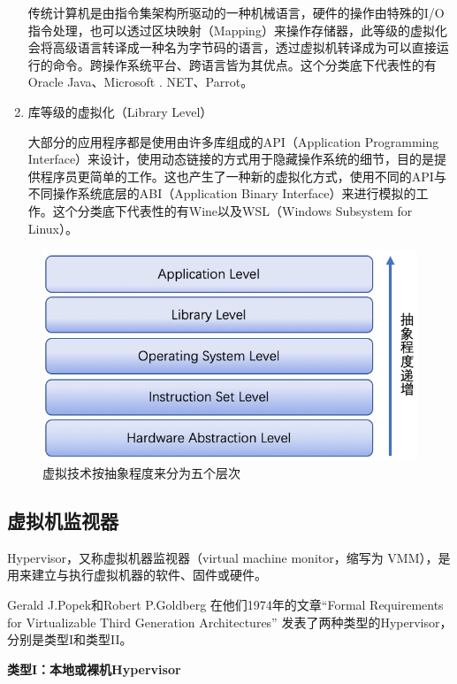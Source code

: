\begin{enumerate}
      \hspace{2em} 传统计算机是由指令集架构所驱动的一种机械语言，硬件的操作由特殊的I/O指令处理，也可以透过区块映射（Mapping）来操作存储器，此等级的虚拟化会将高级语言转译成一种名为字节码的语言，透过虚拟机转译成为可以直接运行的命令。跨操作系统平台、跨语言皆为其优点。这个分类底下代表性的有Oracle Java、Microsoft . NET、Parrot。
    \item 库等级的虚拟化（Library Level）

      \hspace{2em} 大部分的应用程序都是使用由许多库组成的API（Application Programming Interface）来设计，使用动态链接的方式用于隐藏操作系统的细节，目的是提供程序员更简单的工作。这也产生了一种新的虚拟化方式，使用不同的API与不同操作系统底层的ABI（Application Binary Interface）来进行模拟的工作。这个分类底下代表性的有Wine以及WSL（Windows Subsystem for Linux）。
\end{enumerate}

\begin{figure}[htb]
  \centering
  \includegraphics{./Figure/IMG_Chap2_1.png}
  \caption{虚拟技术按抽象程度来分为五个层次}\label{Fig:chap2_1}
\end{figure}

\subsection{虚拟机监视器}
Hypervisor，又称虚拟机器监视器（virtual machine monitor，缩写为 VMM），是用来建立与执行虚拟机器的软件、固件或硬件。

Gerald J.Popek和Robert P.Goldberg 在他们1974年的文章“Formal Requirements for Virtualizable Third Generation Architectures” 发表了两种类型的Hypervisor，分别是类型I和类型II\cite{Kudinskas}。

\textbf{类型I：本地或裸机Hypervisor}

